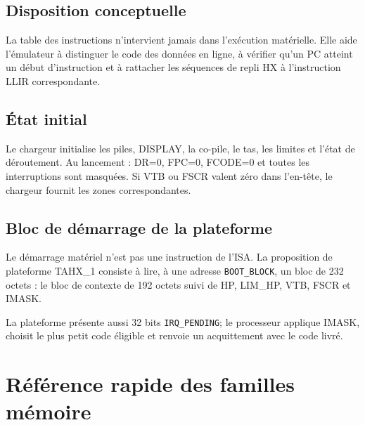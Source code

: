 \documentclass[10pt,a4paper,twoside,openany]{book}
\newcommand{\reg}[1]{\textsc{#1}}
\begin{document}
\section{Disposition conceptuelle}
\begin{center}
\end{center}

La table des instructions n'intervient jamais dans l'exécution matérielle. Elle aide l'émulateur à distinguer le code des données en ligne, à vérifier qu'un PC atteint un début d'instruction et à rattacher les séquences de repli HX à l'instruction LLIR correspondante.

\section{État initial}
Le chargeur initialise les piles, DISPLAY, la co-pile, le tas, les limites et l'état de déroutement. Au lancement : \reg{DR=0}, \reg{FPC=0}, \reg{FCODE=0} et toutes les interruptions sont masquées. Si VTB ou FSCR valent zéro dans l'en-tête, le chargeur fournit les zones correspondantes.

\section{Bloc de démarrage de la plateforme}
Le démarrage matériel n'est pas une instruction de l'ISA. La proposition de plateforme TAHX\_1 consiste à lire, à une adresse \texttt{BOOT\_BLOCK}, un bloc de 232 octets : le bloc de contexte de 192 octets suivi de HP, LIM\_HP, VTB, FSCR et IMASK.

La plateforme présente aussi 32 bits \texttt{IRQ\_PENDING}; le processeur applique IMASK, choisit le plus petit code éligible et renvoie un acquittement avec le code livré.

\chapter{Référence rapide des familles mémoire}
\end{document}
